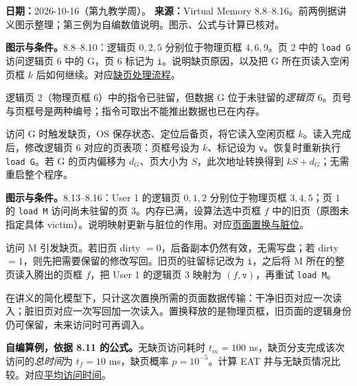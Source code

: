 \begingroup
\renewcommand{\recordid}[1]{}
\renewcommand{\relatedtopic}[2]{\hyperref[topic:#1]{#2}}

\textbf{日期：}2026-10-16（第九教学周）。
\textbf{来源：}Virtual Memory 8.8--8.16。前两例据讲义图示整理；第三例为自编数值说明。图示、公式与计算已核对。

\nopagebreak[4]
\textbf{图示与条件。}8.8--8.10：逻辑页 $0,2,5$ 分别位于物理页框 $4,6,9$。页 $2$ 中的 \texttt{load G} 访问逻辑页 $6$ 中的 G，页 $6$ 标记为 \texttt{i}。说明缺页原因，以及把 G 所在页读入空闲页框 $k$ 后如何继续。对应\relatedtopic{SC2005-L17-T02}{缺页处理流程}。

\begin{checkedsolution}
逻辑页 $2$（物理页框 $6$）中的指令已驻留，但数据 G 位于未驻留的\emph{逻辑页 $6$}。页号与页框号是两种编号；指令可取出不能推出数据也已在内存。

访问 G 时触发缺页，OS 保存状态、定位后备页，将它读入空闲页框 $k$。读入完成后，修改逻辑页 $6$ 对应的页表项：页框号设为 $k$、标记设为 \texttt{v}。恢复时重新执行 \texttt{load G}。若 G 的页内偏移为 $d_G$、页大小为 $S$，此次地址转换得到 $kS+d_G$；无需重启整个程序。
\end{checkedsolution}

\nopagebreak[4]
\textbf{图示与条件。}8.13--8.16：User 1 的逻辑页 $0,1,2$ 分别位于物理页框 $3,4,5$；页 $1$ 的 \texttt{load M} 访问尚未驻留的页 $3$。内存已满，设算法选中页框 $f$ 中的旧页（原图未指定具体 victim）。说明映射更新与脏位的作用。对应\relatedtopic{SC2005-L17-T04}{页面置换与脏位}。

\begin{checkedsolution}
访问 M 引发缺页。若旧页 dirty $=0$，后备副本仍然有效，无需写盘；若 dirty $=1$，则先把需要保留的修改写回。旧页的驻留标记改为 \texttt{i}，之后将 M 所在的整页读入腾出的页框 $f$，把 User 1 的逻辑页 $3$ 映射为 $(f,\texttt{v})$，再重试 \texttt{load M}。

在讲义的简化模型下，只计这次置换所需的页面数据传输：干净旧页对应一次读入；脏旧页对应一次写回加一次读入。置换释放的是物理页框，旧页面的逻辑身份仍可保留，未来访问时可再调入。
\end{checkedsolution}

\nopagebreak[4]
\textbf{自编算例，依据 8.11 的公式。}无缺页访问耗时 $t_m=100$ ns，缺页分支完成该次访问的\emph{总时间}为 $t_f=10$ ms，缺页概率 $p=10^{-5}$。计算 EAT 并与无缺页情况比较。对应\relatedtopic{SC2005-L17-T03}{平均访问时间}。

